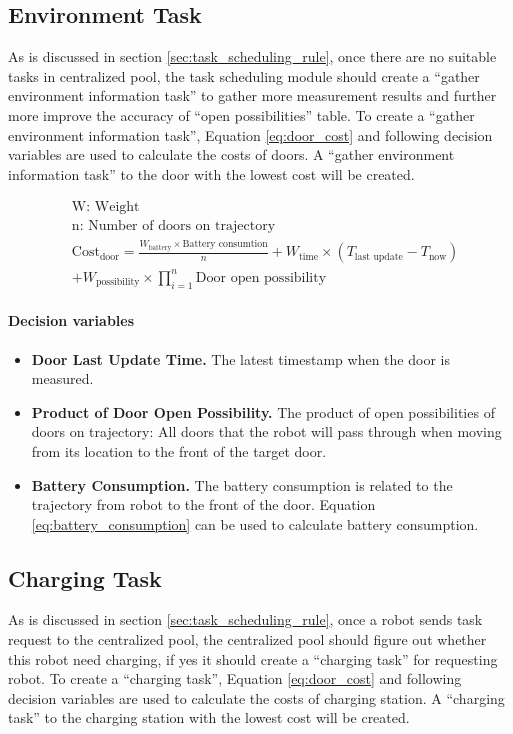 \subsection{Environment Task}
As is discussed in section \ref{sec:task_scheduling_rule}, once there are no suitable tasks in centralized pool, the task scheduling module should create a ``gather environment information task'' to gather more measurement results and further more improve the accuracy of ``open possibilities'' table.
To create a ``gather environment information task'', Equation \ref{eq:door_cost} and following decision variables are used to calculate the costs of doors. A ``gather environment information task'' to the door with the lowest cost will be created.

\begin{equation}
	\label{eq:door_cost}
	\begin{aligned}
	& \mbox{W: Weight } \\
	& \mbox{n: Number of doors on trajectory} \\	
	& \mbox{Cost}_{\mbox{door}} = \frac{W_{\mbox{battery}} \times \mbox{Battery consumtion}}{n} + W_{\mbox{time}} \times (T_{\mbox{last update}} - T_{\mbox{now}}) \\
	& + W_{\mbox{possibility}} \times \prod\limits_{i=1}^n \mbox{Door open possibility}
	\end{aligned}
\end{equation}

\paragraph{Decision variables}
\begin{itemize}
	\item \textbf{Door Last Update Time.} The latest timestamp when the door is measured.
	\item \textbf{Product of Door Open Possibility.} The product of open possibilities of doors on trajectory: All doors that the robot will pass through when moving from its location to the front of the target door.
	\item \textbf{Battery Consumption.} The battery consumption is related to the trajectory from robot to the front of the door. Equation \ref{eq:battery_consumption} can be used to calculate battery consumption.
\end{itemize}



\subsection{Charging Task}
As is discussed in section \ref{sec:task_scheduling_rule}, once a robot sends task request to the centralized pool, the centralized pool should figure out whether this robot need charging, if yes it should create a ``charging task'' for requesting robot. 
To create a ``charging task'', Equation \ref{eq:door_cost} and following decision variables are used to calculate the costs of charging station. A ``charging task'' to the charging station with the lowest cost will be created.

